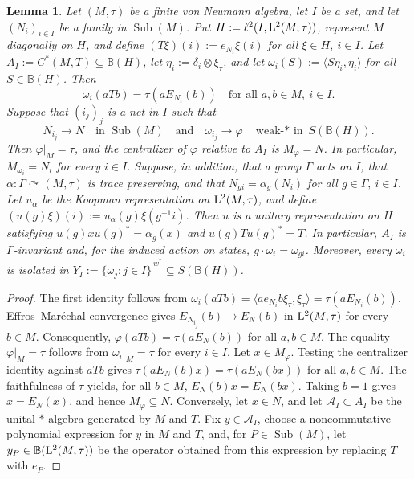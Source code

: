 \documentclass[12pt]{amsart} %
\theoremstyle{plain}
\newtheorem{lemma}[theorem]{Lemma}
\theoremstyle{definition}
\newcommand{\B}{\mathbb{B}}
\newcommand{\LL}{{\rm L}}
\DeclareMathOperator{\Sub}{Sub}
\begin{document}
{
\begin{lemma}\label{lem:diagonal-jones-centralizer}
Let $(M,\tau)$ be a finite von Neumann algebra, let $I$ be a set, and let
$(N_i)_{i\in I}$ be a family in $\Sub(M)$. Put $H:=\ell^2(I,\LL^2(M,\tau))$, represent $M$ diagonally on $H$, and define $(T\xi)(i):=e_{N_i}\xi(i)$ for all $\xi\in H,\ i\in I$. Let $A_I:=C^*(M,T)\subseteq\B(H)$, let
$\eta_i:=\delta_i\otimes\xi_\tau$, and let $\omega_i(S):=\langle S\eta_i,\eta_i\rangle$ for all $S\in{\B(H)}$. Then
$$
\omega_i(aTb)=\tau(aE_{N_i}(b))
\quad\text{for all }a,b\in M,\ i\in I.$$
Suppose that $(i_j)_j$ is a net in $I$ such that
$$
N_{i_j}\to N
\quad\text{in }\Sub(M)
\quad\text{and}\quad
\omega_{i_j}\to\varphi
\quad\text{weak-$*$ in }S(\B(H)).
$$
Then $\varphi|_M=\tau$, and the centralizer of $\varphi$ relative to $A_I$ is $M_\varphi=N$. In particular, $M_{\omega_i}=N_i$ for every $i\in I$.
\medskip
\noindent Suppose, in addition, that a group $\Gamma$ acts on $I$, that
$\alpha:\Gamma\curvearrowright(M,\tau)$ is trace preserving, and that
$N_{gi}=\alpha_g(N_i)$ for all $g\in\Gamma,\ i\in I$. Let $u_\alpha$ be the Koopman representation on $\LL^2(M,\tau)$, and
define $(u(g)\xi)(i):=u_\alpha(g)\xi(g^{-1}i)$. Then $u$ is a unitary representation on $H$ satisfying
$u(g)xu(g)^*=\alpha_g(x)$ and $u(g)Tu(g)^*=T$. In particular, $A_I$ is $\Gamma$-invariant and, for the induced action on
states, $g\cdot\omega_i=\omega_{gi}$.
Moreover, every $\omega_i$ is isolated in $Y_I:=\overline{\{\omega_j:j\in I\}}^{\,w^*}
\subseteq S(\B(H))$.
\end{lemma}
\begin{proof}
The first identity follows from $\omega_i(aTb)
=\langle ae_{N_i}b\xi_\tau,\xi_\tau\rangle
=\tau(aE_{N_i}(b))$. Effros--Mar\'echal convergence gives
$E_{N_{i_j}}(b)\to E_N(b)$ in $\LL^2(M,\tau)$ for every $b\in M$.
Consequently,
$\varphi(aTb)=\tau(aE_N(b))$ for all $a,b\in M$. The equality $\varphi|_M=\tau$ follows from
$\omega_i|_M=\tau$ for every $i\in I$.
Let $x\in M_\varphi$. Testing the centralizer identity against $aTb$ gives
$\tau(aE_N(b)x)=\tau(aE_N(bx))$ for all $a,b\in M$. The faithfulness of $\tau$ yields, for all $b\in M$, $E_N(b)x=E_N(bx)$. Taking $b=1$ gives $x=E_N(x)$, and hence $M_\varphi\subseteq N$. Conversely, let $x\in N$, and let $\mathcal A_{I}\subset A_I$ be the unital
$*$-algebra generated by $M$ and $T$. Fix $y\in\mathcal A_{I}$, choose
a noncommutative polynomial expression for $y$ in $M$ and $T$, and, for
$P\in\Sub(M)$, let $y_P\in\B(\LL^2(M,\tau))$ be the operator obtained
from this expression by replacing $T$ with $e_P$.

\end{proof}}
\end{document}
